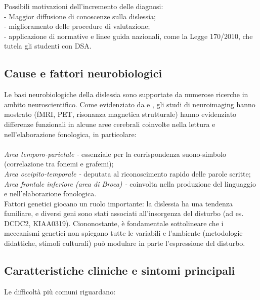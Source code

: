 \documentclass[14pt]{extbook}
\begin{document}
\noindent Possibili motivazioni dell’incremento delle diagnosi:\\

\noindent - Maggior diffusione di conoscenze sulla dislessia;\\
- miglioramento delle procedure di valutazione;\\
- applicazione di normative e linee guida nazionali, come la Legge 170/2010, che tutela gli studenti con DSA.\\
\pagebreak

\subsection{Cause e fattori neurobiologici}

Le basi neurobiologiche della dislessia sono supportate da numerose ricerche in ambito neuroscientifico. Come evidenziato da \cite{cornoldi2016reading} e \cite{shaywitz2003overcoming}, gli studi di neuroimaging hanno mostrato (fMRI, PET, risonanza magnetica strutturale) hanno evidenziato differenze funzionali in alcune aree cerebrali coinvolte nella lettura e nell’elaborazione fonologica, in particolare:\\\\

\noindent\textit{Area temporo-parietale -} essenziale per la corrispondenza suono-simbolo (correlazione tra fonemi e grafemi);\\
\textit{Area occipito-temporale -} deputata al riconoscimento rapido delle parole scritte;\\
\textit{Area frontale inferiore (area di Broca) -} coinvolta nella produzione del linguaggio e nell’elaborazione fonologica.\\

Fattori genetici giocano un ruolo importante: la dislessia ha una tendenza familiare, e diversi geni sono stati associati all’insorgenza del disturbo (ad es. DCDC2, KIAA0319). Ciononostante, è fondamentale sottolineare che i meccanismi genetici non spiegano tutte le variabili e l’ambiente (metodologie didattiche, stimoli culturali) può modulare in parte l’espressione del disturbo.

\subsection{Caratteristiche cliniche e sintomi principali}

Le difficoltà più comuni riguardano:\\
\end{document}
